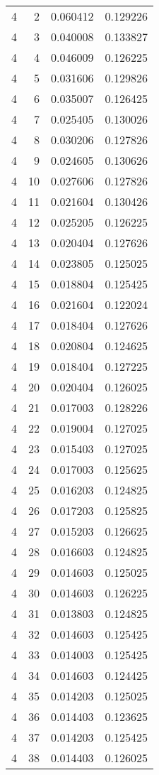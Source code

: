 \begin{longtable}{rrrr}
4 & 2 & 0.060412 & 0.129226 \\
4 & 3 & 0.040008 & 0.133827 \\
4 & 4 & 0.046009 & 0.126225 \\
4 & 5 & 0.031606 & 0.129826 \\
4 & 6 & 0.035007 & 0.126425 \\
4 & 7 & 0.025405 & 0.130026 \\
4 & 8 & 0.030206 & 0.127826 \\
4 & 9 & 0.024605 & 0.130626 \\
4 & 10 & 0.027606 & 0.127826 \\
4 & 11 & 0.021604 & 0.130426 \\
4 & 12 & 0.025205 & 0.126225 \\
4 & 13 & 0.020404 & 0.127626 \\
4 & 14 & 0.023805 & 0.125025 \\
4 & 15 & 0.018804 & 0.125425 \\
4 & 16 & 0.021604 & 0.122024 \\
4 & 17 & 0.018404 & 0.127626 \\
4 & 18 & 0.020804 & 0.124625 \\
4 & 19 & 0.018404 & 0.127225 \\
4 & 20 & 0.020404 & 0.126025 \\
4 & 21 & 0.017003 & 0.128226 \\
4 & 22 & 0.019004 & 0.127025 \\
4 & 23 & 0.015403 & 0.127025 \\
4 & 24 & 0.017003 & 0.125625 \\
4 & 25 & 0.016203 & 0.124825 \\
4 & 26 & 0.017203 & 0.125825 \\
4 & 27 & 0.015203 & 0.126625 \\
4 & 28 & 0.016603 & 0.124825 \\
4 & 29 & 0.014603 & 0.125025 \\
4 & 30 & 0.014603 & 0.126225 \\
4 & 31 & 0.013803 & 0.124825 \\
4 & 32 & 0.014603 & 0.125425 \\
4 & 33 & 0.014003 & 0.125425 \\
4 & 34 & 0.014603 & 0.124425 \\
4 & 35 & 0.014203 & 0.125025 \\
4 & 36 & 0.014403 & 0.123625 \\
4 & 37 & 0.014203 & 0.125425 \\
4 & 38 & 0.014403 & 0.126025 \\

\end{longtable}
